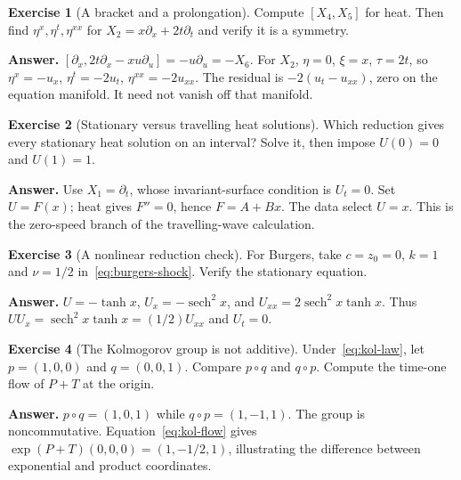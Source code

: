 \documentclass[11pt,a4paper]{article}
\numberwithin{equation}{section}
\theoremstyle{definition}
\newtheorem{exercise}{Exercise}[section]
\theoremstyle{plain}
\theoremstyle{remark}
\begin{document}
\begin{exercise}[A bracket and a prolongation]
Compute $[X_4,X_5]$ for heat. Then find $\eta^x,\eta^t,\eta^{xx}$ for $X_2=x\partial_x+2t\partial_t$ and verify it is a symmetry.
\end{exercise}
\textbf{Answer.} $[\partial_x,2t\partial_x-xu\partial_u]=-u\partial_u=-X_6$. For $X_2$, $\eta=0$, $\xi=x$, $\tau=2t$, so $\eta^x=-u_x$, $\eta^t=-2u_t$, $\eta^{xx}=-2u_{xx}$. The residual is $-2(u_t-u_{xx})$, zero on the equation manifold. It need not vanish off that manifold.

\begin{exercise}[Stationary versus travelling heat solutions]
Which reduction gives every stationary heat solution on an interval? Solve it, then impose $U(0)=0$ and $U(1)=1$.
\end{exercise}
\textbf{Answer.} Use $X_1=\partial_t$, whose invariant-surface condition is $U_t=0$. Set $U=F(x)$; heat gives $F''=0$, hence $F=A+Bx$. The data select $U=x$. This is the zero-speed branch of the travelling-wave calculation.

\begin{exercise}[A nonlinear reduction check]
For Burgers, take $c=z_0=0$, $k=1$ and $\nu=1/2$ in~\eqref{eq:burgers-shock}. Verify the stationary equation.
\end{exercise}
\textbf{Answer.} $U=-\tanh x$, $U_x=-\operatorname{sech}^2x$, and $U_{xx}=2\operatorname{sech}^2x\tanh x$. Thus $UU_x=\operatorname{sech}^2x\tanh x=(1/2)U_{xx}$ and $U_t=0$.

\begin{exercise}[The Kolmogorov group is not additive]
Under~\eqref{eq:kol-law}, let $p=(1,0,0)$ and $q=(0,0,1)$. Compare $p\circ q$ and $q\circ p$. Compute the time-one flow of $P+T$ at the origin.
\end{exercise}
\textbf{Answer.} $p\circ q=(1,0,1)$ while $q\circ p=(1,-1,1)$. The group is noncommutative. Equation~\eqref{eq:kol-flow} gives $\exp(P+T)(0,0,0)=(1,-1/2,1)$, illustrating the difference between exponential and product coordinates.

\clearpage
\end{document}
